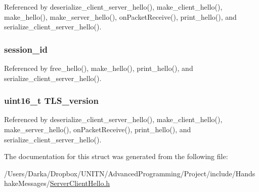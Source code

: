 Referenced by deserialize\+\_\+client\+\_\+server\+\_\+hello(), make\+\_\+client\+\_\+hello(), make\+\_\+hello(), make\+\_\+server\+\_\+hello(), on\+Packet\+Receive(), print\+\_\+hello(), and serialize\+\_\+client\+\_\+server\+\_\+hello().

\subsubsection[{\texorpdfstring{session\+\_\+id}{session_id}}]{ session\+\_\+id}\hypertarget{structserver__client__hello__t_a74379b0c9faddd3c3481e648a4ba2356}{}\label{structserver__client__hello__t_a74379b0c9faddd3c3481e648a4ba2356}


Referenced by free\+\_\+hello(), make\+\_\+hello(), print\+\_\+hello(), and serialize\+\_\+client\+\_\+server\+\_\+hello().

\subsubsection[{\texorpdfstring{T\+L\+S\+\_\+version}{TLS_version}}]{\setlength{\rightskip}{0pt plus 5cm}uint16\+\_\+t {\bf T\+L\+S\+\_\+version}}\hypertarget{structserver__client__hello__t_a5b4305b976c657bb4a056e00aeadb8ef}{}\label{structserver__client__hello__t_a5b4305b976c657bb4a056e00aeadb8ef}


Referenced by deserialize\+\_\+client\+\_\+server\+\_\+hello(), make\+\_\+client\+\_\+hello(), make\+\_\+server\+\_\+hello(), on\+Packet\+Receive(), print\+\_\+hello(), and serialize\+\_\+client\+\_\+server\+\_\+hello().



The documentation for this struct was generated from the following file\+:\begin{DoxyCompactItemize}
\item 
/\+Users/\+Darka/\+Dropbox/\+U\+N\+I\+T\+N/\+Advanced\+Programming/\+Project/include/\+Handshake\+Messages/\hyperlink{_server_client_hello_8h}{Server\+Client\+Hello.\+h}\end{DoxyCompactItemize}
